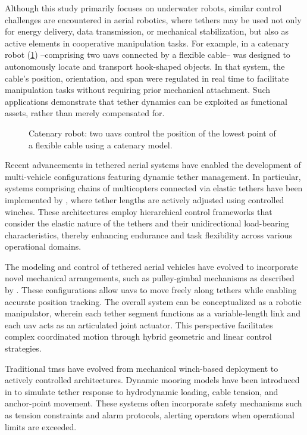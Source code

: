 Although this study primarily focuses on underwater robots, similar control challenges are
encountered in aerial robotics, where tethers may be used not only for energy delivery, data
transmission, or mechanical stabilization, but also as active elements in cooperative manipulation
tasks. For example, in \cite{dantonioCatenaryRobotDesign2021} a catenary robot
(\cref{sota_c_tuuvc_catenary_robot}) --comprising two \acp{uav} connected by a flexible cable-- was
designed to autonomously locate and transport hook-shaped objects. In that system, the cable's
position, orientation, and span were regulated in real time to facilitate manipulation tasks
without requiring prior mechanical attachment. Such applications demonstrate that tether dynamics
can be exploited as functional assets, rather than merely compensated for.

\begin{figure}
	\centering
	\caption{Catenary robot: two \acp{uav} control the position of the lowest point of a flexible cable using a catenary model.}
	\label{sota_c_tuuvc_catenary_robot}
\end{figure}

Recent advancements in tethered aerial systems have enabled the development of multi-vehicle
configurations featuring dynamic tether management. In particular, systems comprising chains of
multicopters connected via elastic tethers have been implemented by
\cite{fagianoSystemsTetheredMulticopters2017}, where tether lengths are actively adjusted using
controlled winches. These architectures employ hierarchical control frameworks that consider the
elastic nature of the tethers and their unidirectional load-bearing characteristics, thereby
enhancing endurance and task flexibility across various operational domains.

The modeling and control of tethered aerial vehicles have evolved to incorporate novel mechanical
arrangements, such as pulley-gimbal mechanisms as described by
\cite{kosarnovskyStringTetheredDrones2019}. These configurations allow \acp{uav} to move freely
along tethers while enabling accurate position tracking. The overall system can be conceptualized
as a robotic manipulator, wherein each tether segment functions as a variable-length link and each
\ac{uav} acts as an articulated joint actuator. This perspective facilitates complex coordinated
motion through hybrid geometric and linear control strategies.

Traditional \acp{tms} have evolved from mechanical winch-based deployment to actively controlled
architectures. Dynamic mooring models have been introduced in
\cite{aaseModelingControlCatenary2018} to simulate tether response to hydrodynamic loading, cable
tension, and anchor-point movement. These systems often incorporate safety mechanisms such as
tension constraints and alarm protocols, alerting operators when operational limits are exceeded.

